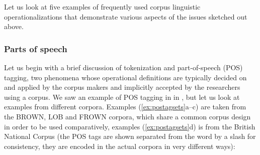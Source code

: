 Let us look at five examples of frequently used corpus linguistic operationalizations  that demonstrate various aspects of the issues sketched out above.

\subsubsection{Parts of speech}
\label{sec:partsofspeech}

Let us begin with a brief discussion of tokenization  and part\hyp{}of\hyp{}speech (POS) tagging,  two phenomena whose operational  definitions are typically decided on and applied by the corpus makers and implicitly accepted by the researchers using a corpus. We saw an example of POS tagging in  in , but let us look at examples from different corpora. Examples (\ref{ex:postagsets}a--c) are taken from the BROWN,  LOB  and FROWN  corpora, which share a common corpus design  in order to be used comparatively, examples (\ref{ex:postagsets}d) is from the British National Corpus (the POS tags are shown separated from the word by a slash for consistency, they are encoded  in the actual corpora in very different ways):

